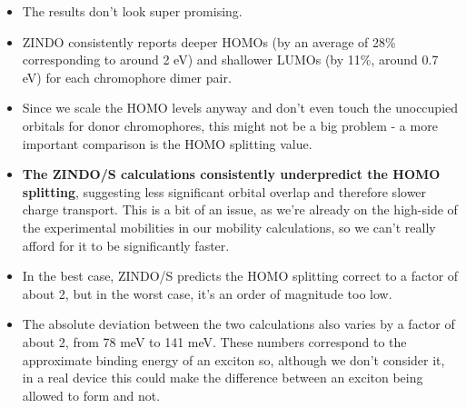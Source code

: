 \documentclass[12pt]{article}
\begin{document}
\begin{itemize}
    \item{The results don't look super promising.}
    \item{ZINDO consistently reports deeper HOMOs (by an average of 28\% corresponding to around 2 eV) and shallower LUMOs (by 11\%, around 0.7 eV) for each chromophore dimer pair.}
    \item{Since we scale the HOMO levels anyway and don't even touch the unoccupied orbitals for donor chromophores, this might not be a big problem - a more important comparison is the HOMO splitting value.}
    \item{\textbf{The ZINDO/S calculations consistently underpredict the HOMO splitting}, suggesting less significant orbital overlap and therefore slower charge transport.
        This is a bit of an issue, as we're already on the high-side of the experimental mobilities in our mobility calculations, so we can't really afford for it to be significantly faster.}
    \item{In the best case, ZINDO/S predicts the HOMO splitting correct to a factor of about 2, but in the worst case, it's an order of magnitude too low.}
    \item{The absolute deviation between the two calculations also varies by a factor of about 2, from 78 meV to 141 meV.
        These numbers correspond to the approximate binding energy of an exciton so, although we don't consider it, in a real device this could make the difference between an exciton being allowed to form and not.}
\end{itemize}


\clearpage



\end{document}
